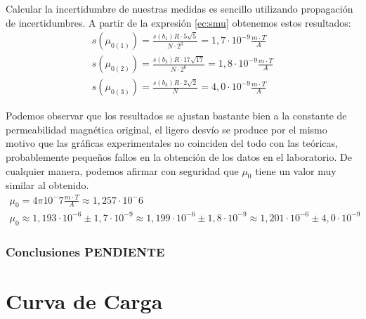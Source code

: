 \documentclass[12pt, a4paper, titlepage]{article}
\begin{document}
  Calcular la incertidumbre de nuestras medidas es sencillo utilizando propagación de incertidumbres. A partir de la expresión \ref{ec:smu} obtenemos estos resultados:
  \begin{gather*}
    s(\mu_{0(1)}) = \frac{s(b_1) R \cdot 5 \sqrt{5}}{N \cdot 2^3} = 1,7 \cdot 10^{-9} \frac{m \cdot T}{A} \\
    s(\mu_{0(2)}) = \frac{s(b_2) R \cdot 17 \sqrt{17}}{N \cdot 2^6} = 1,8 \cdot 10^{-9} \frac{m \cdot T}{A} \\
    s(\mu_{0(3)}) = \frac{s(b_3) R \cdot 2 \sqrt{2}}{N} = 4,0 \cdot 10^{-9} \frac{m \cdot T}{A}
  \end{gather*}

  Podemos observar que los resultados se ajustan bastante bien a la constante de permeabilidad magnética original, el ligero desvío se produce por el mismo motivo que las gráficas experimentales no coinciden del todo con las teóricas, probablemente pequeños fallos en la obtención de los datos en el laboratorio. De cualquier manera, podemos afirmar con seguridad que $\mu_0$ tiene un valor muy similar al obtenido.
  \begin{gather*}
    \mu_0 = 4\pi 10^-7 \frac{m \cdot T}{A} \approx 1,257 \cdot 10^-6 \\
    \mu_0 \approx 1,193 \cdot 10^{-6} \pm 1,7 \cdot 10^{-9} \approx 1,199 \cdot 10^{-6} \pm 1,8 \cdot 10^{-9} \approx 1,201 \cdot 10^{-6} \pm 4,0 \cdot 10^{-9}
  \end{gather*}

  \newpage
  \section{Conclusiones PENDIENTE}

  \newpage
  \thispagestyle{plain}
  \mbox{}

  \newpage
  \part{Curva de Carga}
\end{document}
